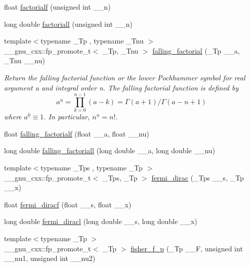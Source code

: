 \begin{DoxyCompactItemize}
float \hyperlink{group__mathsf__gnu_ga5a288283a8ed63e1d2b0145f313a5378}{factorialf} (unsigned int \+\_\+\+\_\+n)
\item 
long double \hyperlink{group__mathsf__gnu_ga0904e504fdc3c8b9b6f5c66a73531584}{factoriall} (unsigned int \+\_\+\+\_\+n)
\item 
{\footnotesize template$<$typename \+\_\+\+Tp , typename \+\_\+\+Tnu $>$ }\\\+\_\+\+\_\+gnu\+\_\+cxx\+::fp\+\_\+promote\+\_\+t$<$ \+\_\+\+Tp, \+\_\+\+Tnu $>$ \hyperlink{group__mathsf__gnu_ga3cc8eb6068c7155ec48b40e20160c5c0}{falling\+\_\+factorial} (\+\_\+\+Tp \+\_\+\+\_\+a, \+\_\+\+Tnu \+\_\+\+\_\+nu)
\begin{DoxyCompactList}\small\item\em Return the falling factorial function or the lower Pochhammer symbol for real argument {\ttfamily a} and integral order {\ttfamily n}. The falling factorial function is defined by \[ a^{\underline{n}} = \prod_{k=0}^{n-1} (a - k) = \Gamma(a + 1) / \Gamma(a - n + 1) \] where $ a^{\underline{0}} \equiv 1 $. In particular, $ n^{\underline{n}} = n! $. \end{DoxyCompactList}\item 
float \hyperlink{group__mathsf__gnu_gaf32abbc790bfa870725728e5470de532}{falling\+\_\+factorialf} (float \+\_\+\+\_\+a, float \+\_\+\+\_\+nu)
\item 
long double \hyperlink{group__mathsf__gnu_gab816c3bcbe00595881799ce969475085}{falling\+\_\+factoriall} (long double \+\_\+\+\_\+a, long double \+\_\+\+\_\+nu)
\item 
{\footnotesize template$<$typename \+\_\+\+Tps , typename \+\_\+\+Tp $>$ }\\\+\_\+\+\_\+gnu\+\_\+cxx\+::fp\+\_\+promote\+\_\+t$<$ \+\_\+\+Tps, \+\_\+\+Tp $>$ \hyperlink{group__mathsf__gnu_ga5468fbaed5cb8384cff7cfb9d2188d1a}{fermi\+\_\+dirac} (\+\_\+\+Tps \+\_\+\+\_\+s, \+\_\+\+Tp \+\_\+\+\_\+x)
\item 
float \hyperlink{group__mathsf__gnu_gacf7f49b2b7bf50fd37d939236712cbe2}{fermi\+\_\+diracf} (float \+\_\+\+\_\+s, float \+\_\+\+\_\+x)
\item 
long double \hyperlink{group__mathsf__gnu_ga3876af54a92853036cc88ec6b8ea5d67}{fermi\+\_\+diracl} (long double \+\_\+\+\_\+s, long double \+\_\+\+\_\+x)
\item 
{\footnotesize template$<$typename \+\_\+\+Tp $>$ }\\\+\_\+\+\_\+gnu\+\_\+cxx\+::fp\+\_\+promote\+\_\+t$<$ \+\_\+\+Tp $>$ \hyperlink{group__mathsf__gnu_ga1c769cbf42c1abecc6881cfe67dc6d14}{fisher\+\_\+f\+\_\+p} (\+\_\+\+Tp \+\_\+\+\_\+F, unsigned int \+\_\+\+\_\+nu1, unsigned int \+\_\+\+\_\+nu2)

\end{DoxyCompactItemize}
